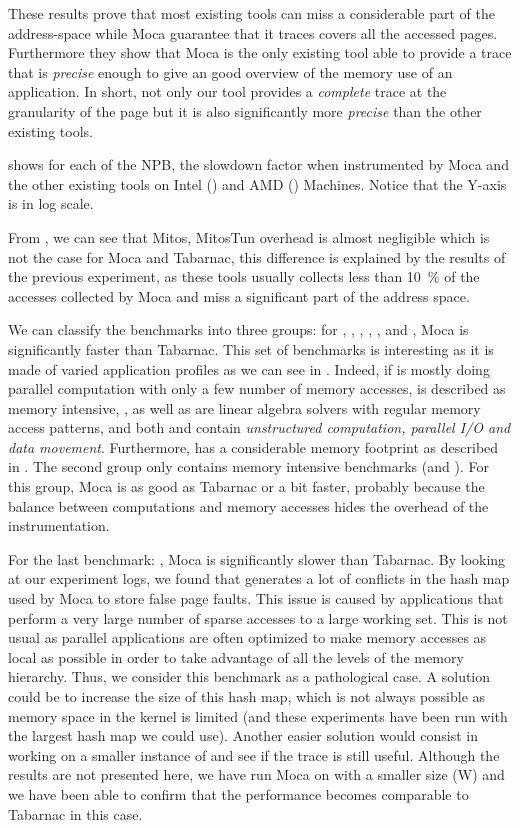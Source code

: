 These results prove that most existing tools can miss a considerable part of
the address-space while \gls{Moca} guarantee that it traces covers all the accessed pages.
Furthermore they show that \gls{Moca} is the only existing tool able to provide a trace that is \emph{precise} enough to give an good overview of the memory use of an application.
In short, not only our tool provides a \emph{complete} trace at the granularity of the page but it is also significantly more \emph{precise} than the other existing tools.

 shows for each of the \gls{NPB}, the slowdown factor when instrumented by \gls{Moca} and the other existing tools on Intel () and AMD () Machines.
Notice that the Y-axis is in log scale.

From , we can see that \gls{Mitos}, MitosTun overhead is almost negligible which is not the case for \gls{Moca} and \gls{Tabarnac}, this difference is explained by the results of the previous experiment, as these tools usually collects less than \SI{10}{\%} of the accesses collected by \gls{Moca} and miss a significant part of the address space.

We can classify the benchmarks into three groups: for \BT, \CG, \DC,  \EP, \LU, \SP and \UA, \gls{Moca} is significantly faster than \gls{Tabarnac}.
This set of benchmarks is interesting as it is made of varied application profiles as we can see in .
Indeed, if \EP is mostly doing parallel computation with only a few number of memory accesses, \CG is described as memory intensive, \BT, \LU as well as \SP are linear algebra solvers with regular memory access patterns, and both \UA and \DC contain \emph{unstructured computation, parallel I/O and data movement}.
Furthermore, \DC has a considerable memory footprint as described in .
The second group only contains memory intensive benchmarks (\FT and
\IS). For this group, \gls{Moca} is as good as \gls{Tabarnac} or a bit faster, probably
because the balance between computations and memory accesses hides the
overhead of the instrumentation.

For the last benchmark: \MG, \gls{Moca} is significantly slower than \gls{Tabarnac}.
By looking at our experiment logs, we found that \MG generates a lot of conflicts in the hash map used by \gls{Moca} to store false page faults.
This issue is caused by applications that perform a very large number of sparse accesses to a large working set.
This is not usual as parallel applications are often optimized to make memory accesses as local as possible in order to take advantage of all the levels of the memory hierarchy.
Thus, we consider this benchmark as a pathological case.
A solution could be to increase the size of this hash map, which is not always possible as memory space in the kernel is limited (and these experiments have been run with the largest hash map we could use).
Another easier solution would consist in working on a smaller instance of \MG and see if the trace is still useful.
Although the results are not presented here, we have run \gls{Moca} on \MG with a smaller size (W) and we have been able to confirm that the performance becomes comparable to \gls{Tabarnac} in this case.

